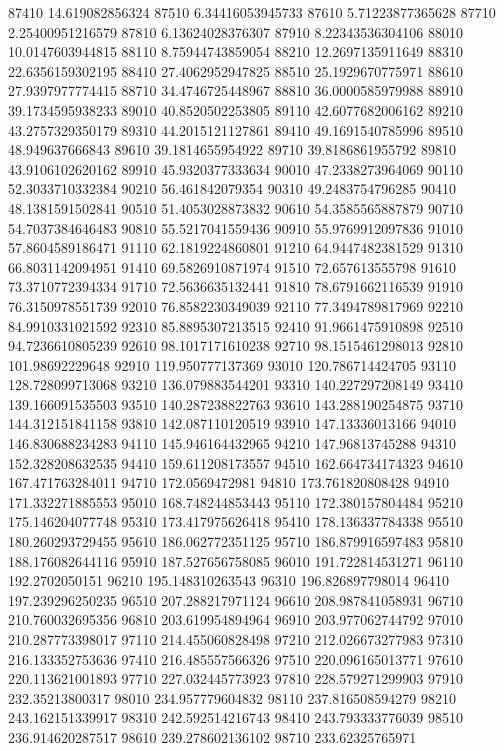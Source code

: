 {87410 14.619082856324
87510 6.34416053945733
87610 5.71223877365628
87710 2.25400951216579
87810 6.13624028376307
87910 8.22343536304106
88010 10.0147603944815
88110 8.75944743859054
88210 12.2697135911649
88310 22.6356159302195
88410 27.4062952947825
88510 25.1929670775971
88610 27.9397977774415
88710 34.4746725448967
88810 36.0000585979988
88910 39.1734595938233
89010 40.8520502253805
89110 42.6077682006162
89210 43.2757329350179
89310 44.2015121127861
89410 49.1691540785996
89510 48.949637666843
89610 39.1814655954922
89710 39.8186861955792
89810 43.9106102620162
89910 45.9320377333634
90010 47.2338273964069
90110 52.3033710332384
90210 56.461842079354
90310 49.2483754796285
90410 48.1381591502841
90510 51.4053028873832
90610 54.3585565887879
90710 54.7037384646483
90810 55.5217041559436
90910 55.9769912097836
91010 57.8604589186471
91110 62.1819224860801
91210 64.9447482381529
91310 66.8031142094951
91410 69.5826910871974
91510 72.657613555798
91610 73.3710772394334
91710 72.5636635132441
91810 78.6791662116539
91910 76.3150978551739
92010 76.8582230349039
92110 77.3494789817969
92210 84.9910331021592
92310 85.8895307213515
92410 91.9661475910898
92510 94.7236610805239
92610 98.1017171610238
92710 98.1515461298013
92810 101.98692229648
92910 119.950777137369
93010 120.786714424705
93110 128.728099713068
93210 136.079883544201
93310 140.227297208149
93410 139.166091535503
93510 140.287238822763
93610 143.288190254875
93710 144.312151841158
93810 142.087110120519
93910 147.13336013166
94010 146.830688234283
94110 145.946164432965
94210 147.96813745288
94310 152.328208632535
94410 159.611208173557
94510 162.664734174323
94610 167.471763284011
94710 172.0569472981
94810 173.761820808428
94910 171.332271885553
95010 168.748244853443
95110 172.380157804484
95210 175.146204077748
95310 173.417975626418
95410 178.136337784338
95510 180.260293729455
95610 186.062772351125
95710 186.879916597483
95810 188.176082644116
95910 187.527656758085
96010 191.722814531271
96110 192.2702050151
96210 195.148310263543
96310 196.826897798014
96410 197.239296250235
96510 207.288217971124
96610 208.987841058931
96710 210.760032695356
96810 203.619954894964
96910 203.977062744792
97010 210.287773398017
97110 214.455060828498
97210 212.026673277983
97310 216.133352753636
97410 216.485557566326
97510 220.096165013771
97610 220.113621001893
97710 227.032445773923
97810 228.579271299903
97910 232.35213800317
98010 234.957779604832
98110 237.816508594279
98210 243.162151339917
98310 242.592514216743
98410 243.793333776039
98510 236.914620287517
98610 239.278602136102
98710 233.62325765971
}
